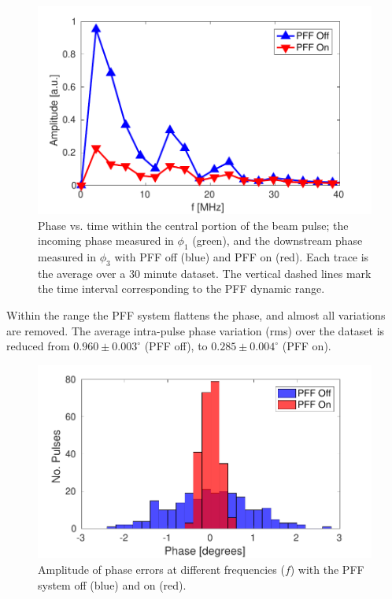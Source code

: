 \documentclass[%
 reprint,
 superscriptaddress,
 amsmath,
 amssymb,
 prl,
]{revtex4-1}
\begin{document}
\begin{figure}
	\includegraphics[width=\columnwidth]{toSubmit/fig6}
	\caption{\label{fig:shape}Phase vs. time within the central portion of the  
	beam pulse; the incoming phase measured in \(\phi_1\) 
	(green), and the downstream phase measured in \(\phi_3\) with PFF off 
	(blue) and PFF on (red). Each trace is the average over a 30 minute dataset.
	The vertical dashed lines mark the time interval corresponding to the PFF 
	dynamic range. }
\end{figure}

Within the range the PFF system flattens the phase, and almost all variations 
are removed. 
The average intra-pulse phase variation (rms) over the dataset is reduced from 
\(0.960\pm0.003^\circ\) (PFF off), to \(0.285\pm0.004^\circ\) (PFF on).

\begin{figure}
	\includegraphics[width=\columnwidth]{toSubmit/fig7}
	\caption{\label{fig:fft}Amplitude of phase errors at different frequencies 
		(\(f\)) with the PFF system off (blue) and on (red).}
\end{figure}
\end{document}
